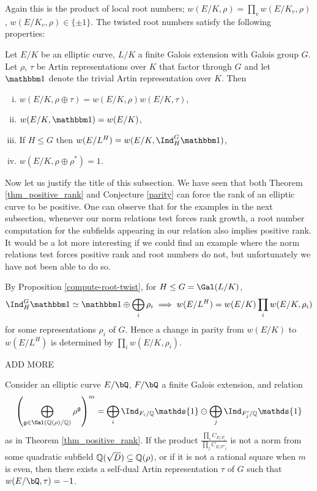 Again this is the product of local root numbers; $w(E / K, \rho) = \prod_v w(E / K_v, \rho)$, $w(E / K_v, \rho) \in \{ \pm 1\}$. The twisted root numbers satisfy the following properties:

\begin{prop}\cite[Lemma A.1, Proposition A.2]{reg-const}\label{compute-root-twist}
    Let $E / K$ be an elliptic curve, $L / K$ a finite Galois extension with Galois group $G$. Let $\rho$, $\tau$ be Artin representations over $K$ that factor through $G$ and let $\trivial$ denote the trivial Artin representation over $K$. Then
    \begin{enumerate}[(i)]
        \setlength\itemsep{0em}
        \item $w(E / K, \rho \oplus \tau) = w(E / K, \rho) w(E / K, \tau)$,
        \item $w(E / K, \trivial) = w(E/ K)$, 
        \item If $H \leq G$ then $w(E / L^H) = w(E/ K, \Ind_{H}^G \trivial)$, 
        \item $w(E / K, \rho \oplus \rho^*) = 1$.
    \end{enumerate}
    
\end{prop}

Now let us justify the title of this subsection. We have seen that both Theorem \ref{thm_positive_rank} and Conjecture \ref{parity} can force the rank of an elliptic curve to be positive. One can observe that for the examples in the next subsection, whenever our norm relations test forces rank growth, a root number computation for the subfields appearing in our relation also implies positive rank. It would be a lot more interesting if we could find an example where the norm relations test forces positive rank and root numbers do not, but unfortunately we have not been able to do so. 

By Proposition \ref{compute-root-twist}, for $H \leq G = \Gal(L / K)$, 
\[ \Ind_{H}^G \trivial \simeq \trivial\oplus \bigoplus_i \rho_i  \implies w(E / L^H) = w(E / K)\prod_i w(E / K, \rho_i) \] for some representations $\rho_i $ of $G $. Hence a change in parity from $w(E / K)$ to $w(E / L^H)$ is determined by $\prod_i w(E / K, \rho_i)$.

{\color{red} ADD MORE}

\begin{conj}
Consider an elliptic curve $E / \bQ$, $F / \bQ$ a finite Galois extension, and relation 
$$\left(\bigoplus_{\mathfrak{g}\in\Gal(\QQ(\rho)/\QQ)}\rho^{\mathfrak{g}}\right)^m=\bigoplus_i\Ind_{F_i/\QQ}\mathds{1}\ominus\bigoplus_j\Ind_{F'_j/\QQ}\mathds{1}$$
as in Theorem \ref{thm_positive_rank}. If the product $\frac{\prod_i C_{E/F_i}}{\prod_j C_{E/F'_j}}$ is not a norm from some quadratic subfield $\mathbb{Q}(\sqrt{D})\subseteq\mathbb{Q}(\rho)$, or if it is not a rational square when $m$ is even, then there exists a self-dual Artin representation $\tau$ of $G$ such that $w(E / \bQ, \tau) = -1 $. 
\end{conj}